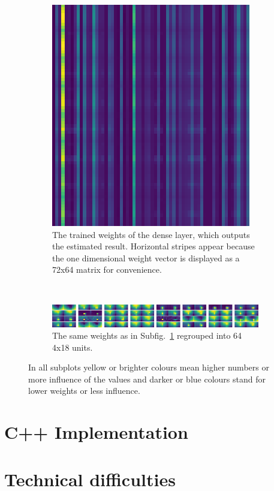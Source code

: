 \begin{figure}[h!]
\begin{subfigure}[t]{0.385\textwidth}
		\includegraphics[width=\textwidth]{img/implementation_neuralNetwork_structureOfOurNeuralNetwork_dense_1.png}
		\caption{The trained weights of the dense layer, which outputs the estimated result. Horizontal stripes appear because the one dimensional weight vector is displayed as a 72x64 matrix for convenience.}
		\label{pic:implementation_neuralNetwork_structureOfOurNeuralNetwork_weights_c}
	\end{subfigure}
	~
	\begin{subfigure}[t]{\textwidth}
		\centering
		\includegraphics[width=\textwidth]{img/implementation_neuralNetwork_structureOfOurNeuralNetwork_dense_1b.png}
		\caption{The same weights as in Subfig.~\ref{pic:implementation_neuralNetwork_structureOfOurNeuralNetwork_weights_c} regrouped into 64 4x18 units.}
		\label{pic:implementation_neuralNetwork_structureOfOurNeuralNetwork_weights_d}
	\end{subfigure}
	\caption{In all subplots yellow or brighter colours mean higher numbers or more influence of the values and darker or blue colours stand for lower weights or less influence.}
	\label{pic:implementation_neuralNetwork_structureOfOurNeuralNetwork_weights}
\end{figure}

\newpage

\section{C++ Implementation}

\section{Technical difficulties}

\filbreak

